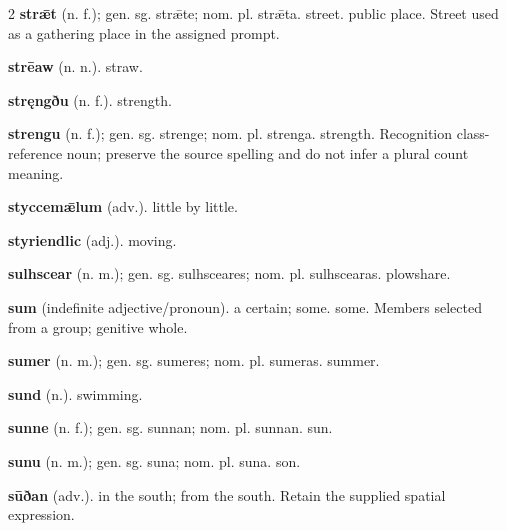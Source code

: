 \begin{multicols*}{2}
\textbf{strǣt} (n. f.); gen. sg. strǣte; nom. pl. strǣta. street. public place. Street used as a gathering place in the assigned prompt.\par
\textbf{strēaw} (n. n.). straw.\par
\textbf{stręngðu} (n. f.). strength.\par
\textbf{strengu} (n. f.); gen. sg. strenge; nom. pl. strenga. strength. Recognition class-reference noun; preserve the source spelling and do not infer a plural count meaning.\par
\textbf{styccemǣlum} (adv.). little by little.\par
\textbf{styriendlic} (adj.). moving.\par
\textbf{sulhscear} (n. m.); gen. sg. sulhsceares; nom. pl. sulhscearas. plowshare.\par
\textbf{sum} (indefinite adjective/pronoun). a certain; some. some. Members selected from a group; genitive whole.\par
\textbf{sumer} (n. m.); gen. sg. sumeres; nom. pl. sumeras. summer.\par
\textbf{sund} (n.). swimming.\par
\textbf{sunne} (n. f.); gen. sg. sunnan; nom. pl. sunnan. sun.\par
\textbf{sunu} (n. m.); gen. sg. suna; nom. pl. suna. son.\par
\textbf{sūðan} (adv.). in the south; from the south. Retain the supplied spatial expression.\par

\end{multicols*}
